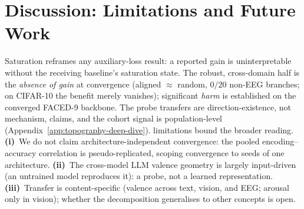 \section{Discussion: Limitations and Future Work}
\label{sec:discussion}

Saturation reframes any auxiliary-loss result: a reported gain is
uninterpretable without the receiving baseline's saturation state. The
robust, cross-domain half is the \emph{absence of gain} at convergence
(aligned $\approx$ random, $0/20$ non-EEG branches; on CIFAR-10 the
benefit merely vanishes); significant \emph{harm} is established on the
converged FACED-9 backbone. The probe transfers are direction-existence, not mechanism,
claims, and the cohort signal is population-level
(Appendix~\ref{app:topography-deep-dive}).  limitations bound the
broader reading. \textbf{(i)}~We do not claim architecture-independent
convergence: the pooled encoding--accuracy correlation is
pseudo-replicated, scoping convergence to seeds of one architecture. \textbf{(ii)}~The cross-model LLM
valence geometry is largely input-driven (an untrained model reproduces
it): a probe, not a learned representation.
\textbf{(iii)}~Transfer is content-specific (valence across text, vision,
and EEG; arousal only in vision); whether the decomposition generalises
to other concepts is open. 
